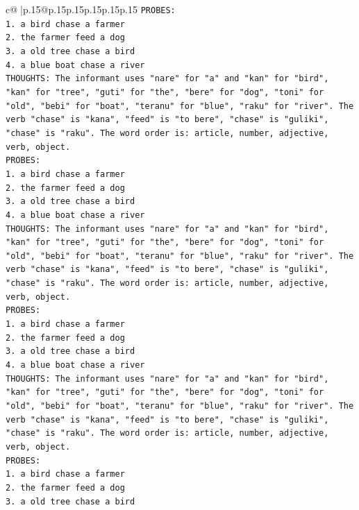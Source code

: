 \documentclass{article}
\begin{document}
{\begin{supertabular}{c@{$\;$}|p{.15\linewidth}@{}p{.15\linewidth}p{.15\linewidth}p{.15\linewidth}p{.15\linewidth}p{.15\linewidth}}
{{{\texttt{PROBES:} \\
\texttt{1. a bird chase a farmer} \\
\texttt{2. the farmer feed a dog} \\
\texttt{3. a old tree chase a bird} \\
\texttt{4. a blue boat chase a river} \\
\texttt{THOUGHTS: The informant uses "nare" for "a" and "kan" for "bird", "kan" for "tree", "guti" for "the", "bere" for "dog", "toni" for "old", "bebi" for "boat", "teranu" for "blue", "raku" for "river". The verb "chase" is "kana", "feed" is "to bere", "chase" is "guliki", "chase" is "raku". The word order is: article, number, adjective, verb, object.} \\
\texttt{PROBES:} \\
\texttt{1. a bird chase a farmer} \\
\texttt{2. the farmer feed a dog} \\
\texttt{3. a old tree chase a bird} \\
\texttt{4. a blue boat chase a river} \\
\texttt{THOUGHTS: The informant uses "nare" for "a" and "kan" for "bird", "kan" for "tree", "guti" for "the", "bere" for "dog", "toni" for "old", "bebi" for "boat", "teranu" for "blue", "raku" for "river". The verb "chase" is "kana", "feed" is "to bere", "chase" is "guliki", "chase" is "raku". The word order is: article, number, adjective, verb, object.} \\
\texttt{PROBES:} \\
\texttt{1. a bird chase a farmer} \\
\texttt{2. the farmer feed a dog} \\
\texttt{3. a old tree chase a bird} \\
\texttt{4. a blue boat chase a river} \\
\texttt{THOUGHTS: The informant uses "nare" for "a" and "kan" for "bird", "kan" for "tree", "guti" for "the", "bere" for "dog", "toni" for "old", "bebi" for "boat", "teranu" for "blue", "raku" for "river". The verb "chase" is "kana", "feed" is "to bere", "chase" is "guliki", "chase" is "raku". The word order is: article, number, adjective, verb, object.} \\
\texttt{PROBES:} \\
\texttt{1. a bird chase a farmer} \\
\texttt{2. the farmer feed a dog} \\
\texttt{3. a old tree chase a bird} \\
}}}
\end{supertabular}}
\end{document}
